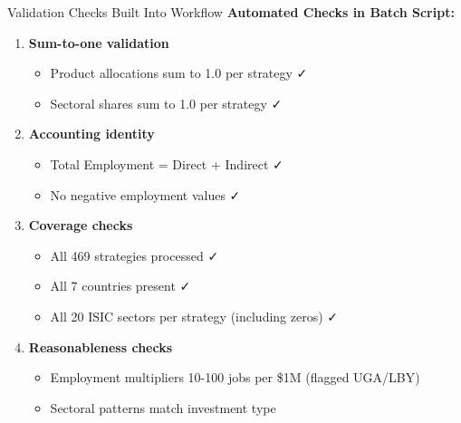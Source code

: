 \documentclass[10pt]{beamer}
\begin{document}

\begin{frame}{Validation Checks Built Into Workflow}
\textbf{Automated Checks in Batch Script:}

\vspace{0.3cm}

\begin{enumerate}
    \item \textbf{Sum-to-one validation}
    \begin{itemize}
        \item Product allocations sum to 1.0 per strategy ✓
        \item Sectoral shares sum to 1.0 per strategy ✓
    \end{itemize}

    \vspace{0.2cm}

    \item \textbf{Accounting identity}
    \begin{itemize}
        \item Total Employment = Direct + Indirect ✓
        \item No negative employment values ✓
    \end{itemize}

    \vspace{0.2cm}

    \item \textbf{Coverage checks}
    \begin{itemize}
        \item All 469 strategies processed ✓
        \item All 7 countries present ✓
        \item All 20 ISIC sectors per strategy (including zeros) ✓
    \end{itemize}

    \vspace{0.2cm}

    \item \textbf{Reasonableness checks}
    \begin{itemize}
        \item Employment multipliers 10-100 jobs per \$1M (flagged UGA/LBY)
        \item Sectoral patterns match investment type
    \end{itemize}
\end{enumerate}

\end{frame}
\end{document}
